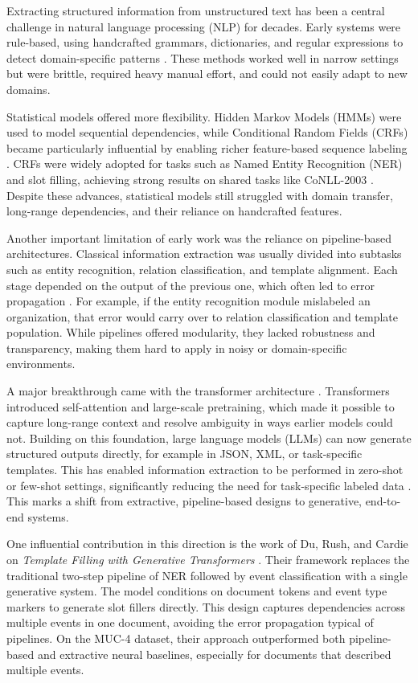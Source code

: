 Extracting structured information from unstructured text has been a central challenge in natural language processing (NLP) for decades. Early systems were rule-based, using handcrafted grammars, dictionaries, and regular expressions to detect domain-specific patterns \cite{grishman1997information}. These methods worked well in narrow settings but were brittle, required heavy manual effort, and could not easily adapt to new domains.

Statistical models offered more flexibility. Hidden Markov Models (HMMs) were used to model sequential dependencies, while Conditional Random Fields (CRFs) became particularly influential by enabling richer feature-based sequence labeling \cite{sarawagi2008information}. CRFs were widely adopted for tasks such as Named Entity Recognition (NER) and slot filling, achieving strong results on shared tasks like CoNLL-2003 \cite{tjong2003introduction}. Despite these advances, statistical models still struggled with domain transfer, long-range dependencies, and their reliance on handcrafted features.

Another important limitation of early work was the reliance on pipeline-based architectures. Classical information extraction was usually divided into subtasks such as entity recognition, relation classification, and template alignment. Each stage depended on the output of the previous one, which often led to error propagation \cite{jurafsky2023speech}. For example, if the entity recognition module mislabeled an organization, that error would carry over to relation classification and template population. While pipelines offered modularity, they lacked robustness and transparency, making them hard to apply in noisy or domain-specific environments.

A major breakthrough came with the transformer architecture \cite{vaswani2017attention}. Transformers introduced self-attention and large-scale pretraining, which made it possible to capture long-range context and resolve ambiguity in ways earlier models could not. Building on this foundation, large language models (LLMs) can now generate structured outputs directly, for example in JSON, XML, or task-specific templates. This has enabled information extraction to be performed in zero-shot or few-shot settings, significantly reducing the need for task-specific labeled data \cite{brown2020language,wei2022emergent}. This marks a shift from extractive, pipeline-based designs to generative, end-to-end systems.

One influential contribution in this direction is the work of Du, Rush, and Cardie on \textit{Template Filling with Generative Transformers} \cite{du2021template}. Their framework replaces the traditional two-step pipeline of NER followed by event classification with a single generative system. The model conditions on document tokens and event type markers to generate slot fillers directly. This design captures dependencies across multiple events in one document, avoiding the error propagation typical of pipelines. On the MUC-4 dataset, their approach outperformed both pipeline-based and extractive neural baselines, especially for documents that described multiple events.

